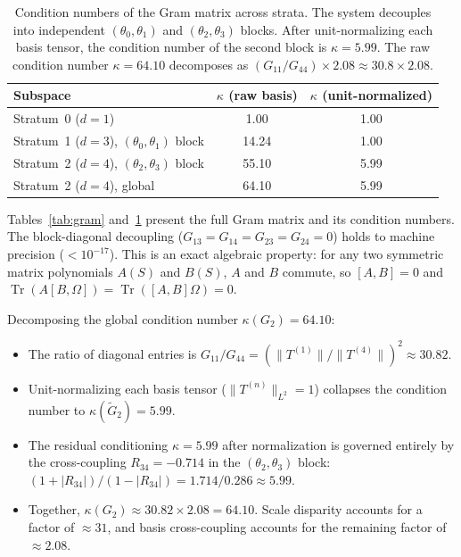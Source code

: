 \documentclass[preprint,aps,prb,longbibliography,superscriptaddress]{revtex4-2}
\newcommand{\Tr}{\operatorname{Tr}}
\begin{document}
\begin{table}[t]
\caption{Condition numbers of the Gram matrix across strata. The system
  decouples into independent $(\theta_0,\theta_1)$ and $(\theta_2,\theta_3)$
  blocks. After unit-normalizing each basis tensor, the condition number of the
  second block is $\kappa = 5.99$. The raw condition number $\kappa = 64.10$
  decomposes as $(G_{11}/G_{44}) \times 2.08 \approx 30.8 \times 2.08$.}\label{tab:kappa}
\begin{ruledtabular}
\begin{tabular}{lcc}
  Subspace & $\kappa$ (raw basis) & $\kappa$ (unit-normalized) \\
  \midrule
  Stratum~0 ($d=1$) & 1.00 & 1.00 \\
  Stratum~1 ($d=3$), $(\theta_0,\theta_1)$ block & 14.24 & 1.00 \\
  Stratum~2 ($d=4$), $(\theta_2,\theta_3)$ block & 55.10 & 5.99 \\
  Stratum~2 ($d=4$), global & 64.10 & 5.99 \\
\end{tabular}
\end{ruledtabular}
\end{table}

Tables~\ref{tab:gram} and~\ref{tab:kappa} present the full Gram matrix and its
condition numbers. The block-diagonal decoupling ($G_{13} = G_{14} = G_{23} =
G_{24} = 0$) holds to machine precision ($< 10^{-17}$). This is an exact
algebraic property: for any two symmetric matrix polynomials $A(S)$ and $B(S)$,
$A$ and $B$ commute, so $[A,B] = 0$ and
$\Tr(A[B,\Omega]) = \Tr([A,B]\Omega) = 0$.

Decomposing the global condition number $\kappa(G_2) = 64.10$:
\begin{itemize}
  \item The ratio of diagonal entries is
    $G_{11}/G_{44} = (\|T^{(1)}\|/\|T^{(4)}\|)^2 \approx 30.82$.
  \item Unit-normalizing each basis tensor ($\|T^{(n)}\|_{L^2} = 1$) collapses
    the condition number to $\kappa(\tilde{G}_2) = 5.99$.
  \item The residual conditioning $\kappa = 5.99$ after normalization is
    governed entirely by the cross-coupling $R_{34} = -0.714$ in the
    $(\theta_2,\theta_3)$ block: $(1 + |R_{34}|)/(1 - |R_{34}|) = 1.714/0.286 \approx 5.99$.
  \item Together, $\kappa(G_2) \approx 30.82 \times 2.08 = 64.10$. Scale disparity
    accounts for a factor of $\approx 31$, and basis cross-coupling accounts for
    the remaining factor of $\approx 2.08$.
\end{itemize}
\end{document}
